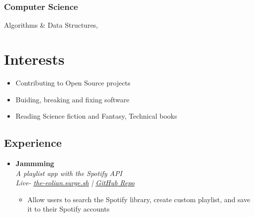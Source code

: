 \documentclass[11pt, oneside, a4paper, titlepage]{article}
\begin{document}
\begin{tcolorbox}
\begin{minipage}[t]{8cm}
\begin{tcolorbox}[grow to left by=0.6cm,colback=gray!25,colframe=white]
        \subsubsection{Computer Science}
        Algorithms \& Data Structures, 

      \section*{Interests}
      \begin{itemize}
        \item{Contributing to Open Source projects}
        \item{Buiding, breaking and fixing software}
        \item{Reading Science fiction and Fantasy, Technical books}
      \end{itemize}
    \end{tcolorbox}
  \end{minipage}
  \begin{minipage}[t]{11cm}
    \vspace*{-0.5cm}
    \begin{tcolorbox}[grow to right by=0.75cm,colframe=white,colback=white]
      \section*{Experience}
      \begin{itemize}
        \item
        {
          \textbf{Jammming} \\
          \textit{A playlist app with the Spotify API} \\
          \textit{Live-  \href{http://the-eolian.surge.sh}{\underline{the-eolian.surge.sh}} | \href{https://github.com/SazedWorldbringer/codecademy-jammming}{\underline{GitHub Repo}}} \\
          \vspace*{-0.7cm}
          \begin{itemize}
            \item Allow users to search the Spotify library, create custom playlist, and save it to their Spotify accounts 
          \end{itemize}
        }


\end{itemize}
\end{tcolorbox}
\end{minipage}
\end{tcolorbox}
\end{document}
